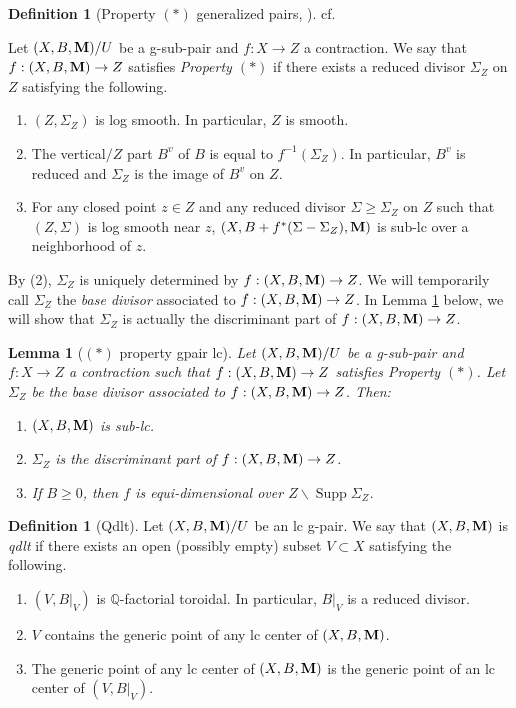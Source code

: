 \documentclass[11pt]{amsart}
\numberwithin{equation}{section}
\newcommand{\Mm}{{\bf{M}}}
\newcommand{\Qq}{\mathbb{Q}}
\newcommand{\Supp}{\operatorname{Supp}}
\newtheorem{lem}[thm]{Lemma}
\theoremstyle{definition}
\newtheorem{defn}[thm]{Definition}
\theoremstyle{definition}
\theoremstyle{definition}
\begin{document}
\begin{defn}[Property $(*)$ generalized pairs, ]\label{defn: property *}
cf. {\cite[Definition 2.13]{ACSS21}}

Let $(X,B,\Mm)/U$ be a g-sub-pair and $f: X\rightarrow Z$ a contraction. We say that $f: (X,B,\Mm)\rightarrow Z$ satisfies \emph{Property $(*)$} if there exists a reduced divisor $\Sigma_Z$ on $Z$ satisfying the following.
\begin{enumerate}
\item $(Z,\Sigma_Z)$ is log smooth. In particular, $Z$ is smooth.
\item The vertical$/Z$ part $B^v$ of $B$ is equal to $f^{-1}(\Sigma_Z)$. In particular, $B^v$ is reduced and $\Sigma_Z$ is the image of $B^v$ on $Z$.
\item For any closed point $z\in Z$ and any reduced divisor  $\Sigma\ge \Sigma_Z$ on $Z$ such that  $(Z,\Sigma)$ is log smooth near $z$, $(X,B+f^*(\Sigma-\Sigma_Z),\Mm)$ is sub-lc over a neighborhood of $z$.
\end{enumerate}
By (2), $\Sigma_Z$ is uniquely determined by $f: (X,B,\Mm)\rightarrow Z$. We will temporarily call $\Sigma_Z$ the \emph{base divisor} associated to $f: (X,B,\Mm)\rightarrow Z$. In Lemma \ref{lem: basic property (*) gpair} below, we will show that $\Sigma_Z$ is actually the discriminant part of $f: (X,B,\Mm)\rightarrow Z$.
\end{defn}

\begin{lem}[$(*)$ property gpair lc]\label{lem: basic property (*) gpair}
Let $(X,B,\Mm)/U$ be a g-sub-pair and $f: X\rightarrow Z$ a contraction such that $f: (X,B,\Mm)\rightarrow Z$ satisfies Property $(*)$. Let $\Sigma_Z$ be the base divisor associated to $f: (X,B,\Mm)\rightarrow Z$. Then:
\begin{enumerate}
\item $(X,B,\Mm)$ is sub-lc.
\item $\Sigma_Z$ is the discriminant part of $f: (X,B,\Mm)\rightarrow Z$.
\item If $B\geq 0$, then $f$ is equi-dimensional over $Z\backslash\Supp\Sigma_Z$.
\end{enumerate}
\end{lem}

\begin{defn}[Qdlt]\label{defn: qdlt}
Let $(X,B,\Mm)/U$ be an lc g-pair. We say that $(X,B,\Mm)$ is \emph{qdlt} if there exists an open (possibly empty) subset $V\subset X$ satisfying the following.
\begin{enumerate}
    \item $(V,B|_V)$ is $\Qq$-factorial toroidal. In particular, $B|_V$ is a reduced divisor. 
    \item $V$ contains the generic point of any lc center of $(X,B,\Mm)$.
    \item The generic point of any lc center of $(X,B,\Mm)$ is the generic point of an lc center of $(V,B|_V)$.
\end{enumerate}
\end{defn}
\end{document}
